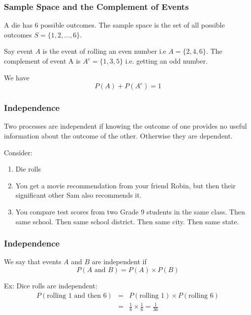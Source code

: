 \documentclass[handout]{beamer}
\newcommand{\blue}[1]{\textcolor{blue2}{#1}}
\begin{document}
\begin{frame}
\frametitle{Sample Space and the Complement of Events}
%
%
A die has 6 possible outcomes.  The \blue{sample space} is the set of all possible outcomes $S = \{1, 2, \ldots, 6\}$.  

\pause \vspace{0.75cm}
Say event $A$ is the event of rolling an even number i.e $A=\{2, 4, 6\}$.  The \blue{complement of event} A is $A^c=\{1, 3, 5\}$ i.e. getting an odd number.  

\pause \vspace{0.75cm}
We have
\[
P(A) + P(A^c) = 1
\]

\end{frame}


\begin{frame}
\frametitle{Independence}
Two processes are \blue{independent} if knowing the outcome of one provides no useful information about the outcome of the other.  Otherwise they are dependent.

\vspace{0.5cm}
Consider:
\begin{enumerate}
\pause \item Die rolls
\pause \item You get a movie recommendation from your friend Robin, but then their significant other Sam also recommends it.  
\pause \item You compare test scores from two Grade 9 students in the same class.  Then same school.  Then same school district.  Then same city.  Then same state.
\end{enumerate}

\end{frame}


\begin{frame}
\frametitle{Independence}
%
%
We say that events $A$ and $B$ are \blue{independent} if
\[
P(A \mbox{ and } B) = P(A) \times P(B)
\]

\vspace{0.25cm}

\pause Ex: Dice rolls are independent:
\begin{eqnarray*}
P(\mbox{rolling 1 and then 6}) &=& P(\mbox{rolling 1}) \times P(\mbox{rolling 6})\\
&=& \frac{1}{6}\times\frac{1}{6} = \frac{1}{36}
\end{eqnarray*}

\end{frame}
\end{document}
